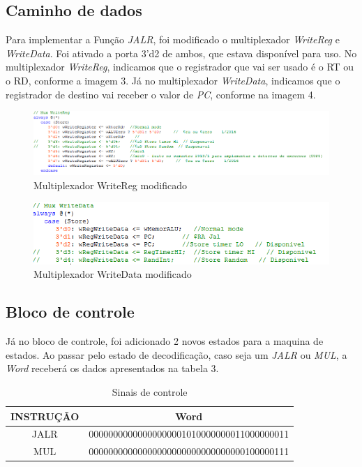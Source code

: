 \documentclass[12pt]{article}
\begin{document}
\subsection{Caminho de dados}
\label{subsec:datapath}

Para implementar a Função \textit{JALR}, foi modificado o multiplexador \textit{WriteReg} e \textit{WriteData}. Foi ativado a porta 3'd2 de ambos, que estava disponível para uso. No multiplexador \textit{WriteReg}, indicamos que o registrador que vai ser usado é o RT ou o RD, conforme a imagem 3. Já no multiplexador \textit{WriteData}, indicamos que o registrador de destino vai receber o valor de \textit{PC}, conforme na imagem 4.    

\begin{figure}[H]
	\flushleft
	\includegraphics[width=1\textwidth]{MUXWR.png}
	\caption{Multiplexador WriteReg modificado}
	\label{fig:pest}
\end{figure}

\begin{figure}[H]
	\flushleft
	\includegraphics[width=1\textwidth]{MUXWD.png}
	\caption{Multiplexador WriteData modificado}
	\label{fig:pest}
\end{figure}

\subsection{Bloco de controle}
\label{subsec:control}

Já no bloco de controle, foi adicionado 2 novos estados para a maquina de estados. Ao passar pelo estado de decodificação, caso seja um \textit{JALR} ou \textit{MUL}, a \textit{Word} receberá os dados apresentados na tabela 3.

\begin{table}[H]
	\centering
	\begin{tabular}{|c|c|}
		\hline
		INSTRUÇÃO & Word \\\hline
		JALR & 00000000000000000001010000000011000000011 \\\hline
	    MUL  & 00000000000000000000000000000000100000111 \\\hline
	\end{tabular}
	\caption{Sinais de controle}
	\label{tab:mul}
\end{table}
\end{document}
